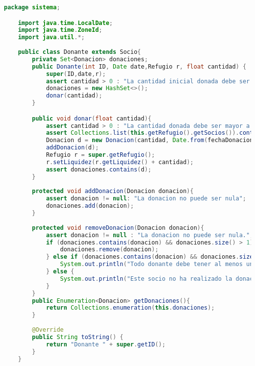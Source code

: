 \begin{lstlisting}[style = javaNormal, language=Java] 
    package sistema;

    import java.time.LocalDate;
    import java.time.ZoneId;
    import java.util.*;
    
    public class Donante extends Socio{
        private Set<Donacion> donaciones;
        public Donante(int ID, Date date,Refugio r, float cantidad) {
            super(ID,date,r);
            assert cantidad > 0 : "La cantidad inicial donada debe ser mayor a cero.";
            donaciones = new HashSet<>();
            donar(cantidad);
        }

        public void donar(float cantidad){
            assert cantidad > 0 : "La cantidad donada debe ser mayor a cero.";
            assert Collections.list(this.getRefugio().getSocios()).contains(this): "El socio debe ser donante antes de poder donar";
            Donacion d = new Donacion(cantidad, Date.from(fechaDonacion.atStartOfDay(ZoneId.systemDefault()).toInstant()));
            addDonacion(d);
            Refugio r = super.getRefugio();
            r.setLiquidez(r.getLiquidez() + cantidad);
            assert donaciones.contains(d);
        }
    
        protected void addDonacion(Donacion donacion){
            assert donacion != null: "La donacion no puede ser nula";
            donaciones.add(donacion);
        }
    
        protected void removeDonacion(Donacion donacion){
            assert donacion != null : "La donacion no puede ser nula.";
            if (donaciones.contains(donacion) && donaciones.size() > 1) {
                donaciones.remove(donacion);
            } else if (donaciones.contains(donacion) && donaciones.size() == 1) {
                System.out.println("Todo donante debe tener al menos una donacion, estas intentando eliminar la unica donacion asociada a este socio donante");
            } else {
                System.out.println("Este socio no ha realizado la donacion que intentas eliminar");
            }
        }
        public Enumeration<Donacion> getDonaciones(){
            return Collections.enumeration(this.donaciones);
        }
    
        @Override
        public String toString() {
            return "Donante " + super.getID();
        }
    }
    
\end{lstlisting}

